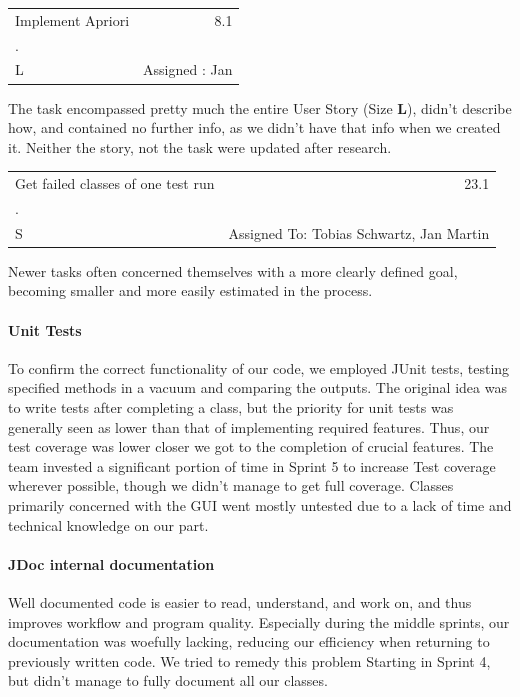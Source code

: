 \begin{table}
  \label{Example Task 1: 8.1}
  \centering
	\begin{tabular}[!th]{ |p{3.5cm} p{2.7cm}| }
	\hline
	Implement Apriori \hfill \break & \multicolumn{1}{r}{8.1} \\
	 . & \\
	 \hfill \break
	 L & \hfill \break Assigned : Jan \\
	 \hline
	\end{tabular}
\end{table}

The task encompassed pretty much the entire User Story (Size \textbf{L}), didn't describe how, and contained no further info, as we didn't have that info when we created it. Neither the story, not the task were updated after research.

\begin{table}
  \label{Example Task 2: 23.1}
  \centering
	\begin{tabular}[!h]{ |p{3.5cm} p{2.7cm}| }
	\hline
	Get failed classes of one test run & \multicolumn{1}{r}{23.1} \\
	 . & \\
	 \hfill \break \break
	 S & Assigned To: \break Tobias Schwartz, \break Jan Martin \\
	 \hline
	\end{tabular}
\end{table}
Newer tasks often concerned themselves with a more clearly defined goal, becoming smaller and more easily estimated in the process. 

\paragraph{Unit Tests}
To confirm the correct functionality of our code, we employed JUnit tests, testing specified methods in a vacuum and comparing the outputs. 
The original idea was to write tests after completing a class, but the priority for unit tests was generally seen as lower than that of implementing required features. Thus, our test coverage was lower closer we got to the completion of crucial features. 
The team invested a significant portion of time in Sprint 5 to increase Test coverage wherever possible, though we didn't manage to get full coverage. 
Classes primarily concerned with the GUI went mostly untested due to a lack of time and technical knowledge on our part. 

\paragraph{JDoc internal documentation}
Well documented code is easier to read, understand, and work on, and thus improves workflow and program quality. Especially during the middle sprints, our documentation was woefully lacking, reducing our efficiency when returning to previously written code. We tried to remedy this problem Starting in Sprint 4, but didn't manage to fully document all our classes.

